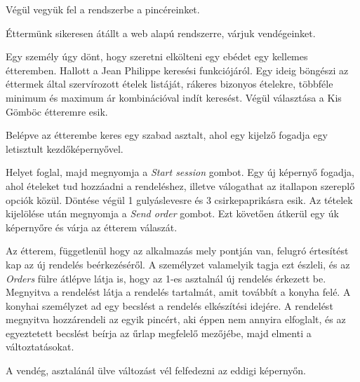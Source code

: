 
Végül vegyük fel a rendszerbe a pincéreinket.


Éttermünk sikeresen átállt a web alapú rendszerre, várjuk vendégeinket.

Egy személy úgy dönt, hogy szeretni elkölteni egy ebédet egy kellemes étteremben. Hallott a Jean Philippe keresési funkciójáról. Egy ideig böngészi az éttermek által szervírozott ételek listáját, rákeres bizonyos ételekre, többféle minimum és maximum ár kombinációval indít keresést. Végül választása a Kis Gömböc étteremre esik.


Belépve az étterembe keres egy szabad asztalt, ahol egy kijelző fogadja egy letisztult kezdőképernyővel.


Helyet foglal, majd megnyomja a \emph{Start session} gombot. Egy új képernyő fogadja, ahol ételeket tud hozzáadni a rendeléshez, illetve válogathat az itallapon szereplő opciók közül. Döntése végül 1 gulyáslevesre és 3 csirkepaprikásra esik. Az tételek kijelölése után megnyomja a \emph{Send order} gombot. Ezt követően átkerül egy úk képernyőre és várja az étterem válaszát.


Az étterem, függetlenül hogy az alkalmazás mely pontján van, felugró értesítést kap az új rendelés beérkezéséről. A személyzet valamelyik tagja ezt észleli, és az \emph{Orders} fülre átlépve látja is, hogy az 1-es asztalnál új rendelés érkezett be. Megnyitva a rendelést látja a rendelés tartalmát, amit továbbít a konyha felé. A konyhai személyzet ad egy becslést a rendelés elkészítési idejére. A rendelést megnyitva hozzárendeli az egyik pincért, aki éppen nem annyira elfoglalt, és az egyeztetett becslést beírja az űrlap megfelelő mezőjébe, majd elmenti a változtatásokat. \par


A vendég, asztalánál ülve változást vél felfedezni az eddigi képernyőn.

